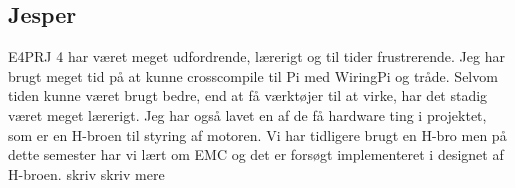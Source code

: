\subsection{Jesper} 

E4PRJ 4 har været meget udfordrende, lærerigt og til tider frustrerende. Jeg har brugt meget tid på at kunne crosscompile til Pi med WiringPi og tråde. Selvom tiden kunne været brugt bedre, end at få værktøjer til at virke, har det stadig været meget lærerigt. Jeg har også lavet en af de få hardware ting i projektet, som er en H-broen til styring af motoren. Vi har tidligere brugt en H-bro men på dette semester har vi lært om EMC og det er forsøgt implementeret i designet af H-broen.
\newline 
skriv skriv mere
